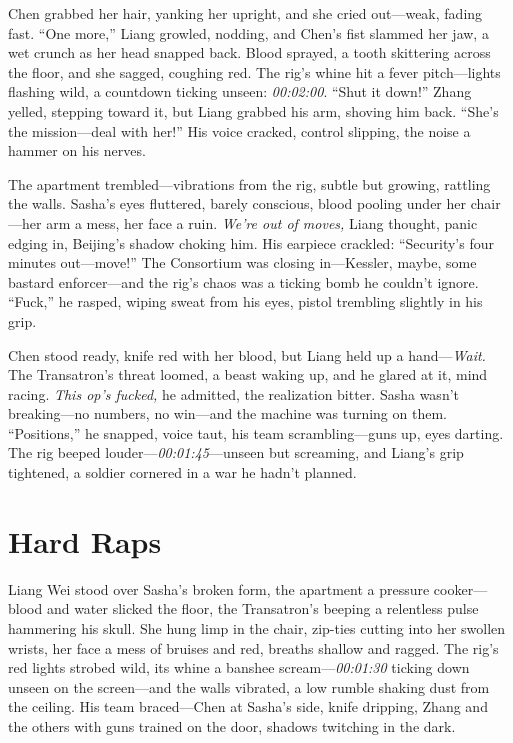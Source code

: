 \documentclass[12pt]{book}
\begin{document}
Chen grabbed her hair, yanking her upright, and she cried out—weak, fading fast. “One more,” Liang growled, nodding, and Chen’s fist slammed her jaw, a wet crunch as her head snapped back. Blood sprayed, a tooth skittering across the floor, and she sagged, coughing red. The rig’s whine hit a fever pitch—lights flashing wild, a countdown ticking unseen: \textit{00:02:00}. “Shut it down!” Zhang yelled, stepping toward it, but Liang grabbed his arm, shoving him back. “She’s the mission—deal with her!” His voice cracked, control slipping, the noise a hammer on his nerves.

The apartment trembled—vibrations from the rig, subtle but growing, rattling the walls. Sasha’s eyes fluttered, barely conscious, blood pooling under her chair—her arm a mess, her face a ruin. \textit{We’re out of moves,} Liang thought, panic edging in, Beijing’s shadow choking him. His earpiece crackled: “Security’s four minutes out—move!” The Consortium was closing in—Kessler, maybe, some bastard enforcer—and the rig’s chaos was a ticking bomb he couldn’t ignore. “Fuck,” he rasped, wiping sweat from his eyes, pistol trembling slightly in his grip.

Chen stood ready, knife red with her blood, but Liang held up a hand—\textit{Wait.} The Transatron’s threat loomed, a beast waking up, and he glared at it, mind racing. \textit{This op’s fucked,} he admitted, the realization bitter. Sasha wasn’t breaking—no numbers, no win—and the machine was turning on them. “Positions,” he snapped, voice taut, his team scrambling—guns up, eyes darting. The rig beeped louder—\textit{00:01:45}—unseen but screaming, and Liang’s grip tightened, a soldier cornered in a war he hadn’t planned.

\section{Hard Raps}

Liang Wei stood over Sasha’s broken form, the apartment a pressure cooker—blood and water slicked the floor, the Transatron’s beeping a relentless pulse hammering his skull. She hung limp in the chair, zip-ties cutting into her swollen wrists, her face a mess of bruises and red, breaths shallow and ragged. The rig’s red lights strobed wild, its whine a banshee scream—\textit{00:01:30} ticking down unseen on the screen—and the walls vibrated, a low rumble shaking dust from the ceiling. His team braced—Chen at Sasha’s side, knife dripping, Zhang and the others with guns trained on the door, shadows twitching in the dark.
\end{document}
